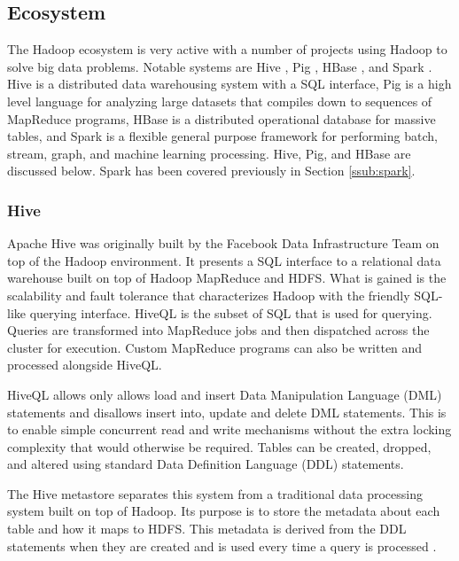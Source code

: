 \documentclass[12pt]{article}
\begin{document}
\subsection{Ecosystem} \label{sub:ecosystem}

The Hadoop ecosystem is very active with a number of projects using Hadoop to solve big data problems. Notable systems are Hive \cite{thusoo2009hive}, Pig \cite{olston2008pig}, HBase \cite{chang2008bigtable}, and Spark \cite{zaharia2010spark}. Hive is a distributed data warehousing system with a SQL interface, Pig is a high level language for analyzing large datasets that compiles down to sequences of MapReduce programs, HBase is a distributed operational database for massive tables, and Spark is a flexible general purpose framework for performing batch, stream, graph, and machine learning processing. Hive, Pig, and HBase are discussed below. Spark has been covered previously in Section \ref{ssub:spark}.



\subsubsection{Hive} \label{ssub:hive}

Apache Hive \cite{thusoo2009hive,sakr2013hadoop} was originally built by the Facebook Data Infrastructure Team on top of the Hadoop environment. It presents a SQL interface to a relational data warehouse built on top of Hadoop MapReduce and HDFS. What is gained is the scalability and fault tolerance that characterizes Hadoop with the friendly SQL-like querying interface. HiveQL is the subset of SQL that is used for querying. Queries are transformed into MapReduce jobs and then dispatched across the cluster for execution. Custom MapReduce programs can also be written and processed alongside HiveQL.

HiveQL allows only allows load and insert Data Manipulation Language (DML) statements and disallows insert into, update and delete DML statements. This is to enable simple concurrent read and write mechanisms without the extra locking complexity that would otherwise be required. Tables can be created, dropped, and altered using standard Data Definition Language (DDL) statements.

The Hive metastore separates this system from a traditional data processing system built on top of Hadoop. Its purpose is to store the metadata about each table and how it maps to HDFS. This metadata is derived from the DDL statements when they are created and is used every time a query is processed \cite{sakr2013hadoop}.
\end{document}
